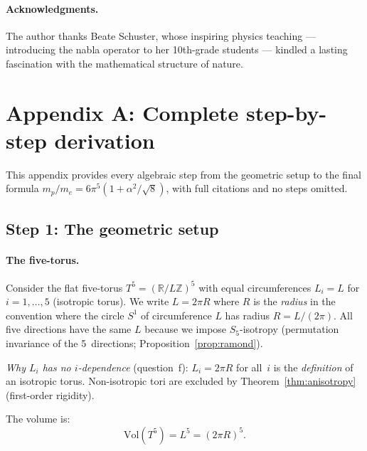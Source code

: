 \documentclass[11pt,a4paper]{article}
\theoremstyle{definition}
\theoremstyle{remark}
\begin{document}
\paragraph{Acknowledgments.}
The author thanks Beate Schuster, whose inspiring physics teaching
--- introducing the nabla operator to her 10th-grade students ---
kindled a lasting fascination with the mathematical structure of
nature.

\section{Appendix A: Complete step-by-step derivation}
\label{app:derivation}

This appendix provides every algebraic step from the geometric
setup to the final formula $m_p/m_e = 6\pi^5(1+\alpha^2/\!\sqrt{8})$,
with full citations and no steps omitted.

\subsection{Step 1: The geometric setup}
\label{app:step1}

\paragraph{The five-torus.}
Consider the flat five-torus $T^5 = (\mathbb{R}/L\mathbb{Z})^5$
with equal circumferences $L_i = L$ for $i=1,\ldots,5$
(isotropic torus).  We write $L = 2\pi R$ where $R$ is
the \emph{radius} in the convention where the circle $S^1$
of circumference $L$ has radius $R = L/(2\pi)$.
All five directions have the same $L$ because we impose
$S_5$-isotropy (permutation invariance of the 5~directions;
Proposition~\ref{prop:ramond}).

\emph{Why $L_i$ has no $i$-dependence} (question~f):
$L_i = 2\pi R$ for all~$i$ is the \emph{definition} of an
isotropic torus.  Non-isotropic tori are excluded by
Theorem~\ref{thm:anisotropy} (first-order rigidity).

The volume is:
\begin{equation}\label{eq:vol}
  \mathrm{Vol}(T^5) = L^5 = (2\pi R)^5.
\end{equation}
\end{document}
